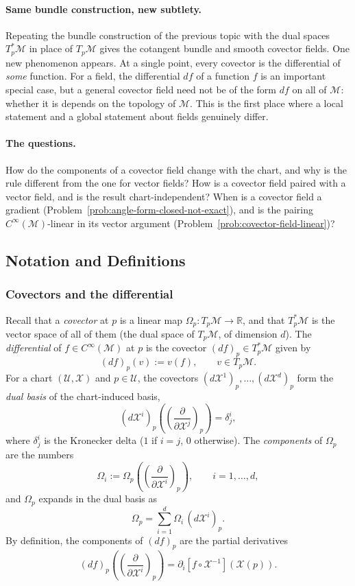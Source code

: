 \documentclass[11pt]{article}
\newcommand{\TpM}{T_p\mathcal M}
\newcommand{\TpsM}{T_p^*\mathcal M}
\newcommand{\Cinf}{C^\infty(\mathcal M)}
\begin{document}
\paragraph{Same bundle construction, new subtlety.}
Repeating the bundle construction of the previous topic with the dual spaces $T_p^*\mathcal M$ in place of $\TpM$ gives the cotangent bundle and smooth covector fields. One new phenomenon appears. At a single point, every covector is the differential of \emph{some} function. For a field, the differential $df$ of a function $f$ is an important special case, but a general covector field need not be of the form $df$ on all of $\mathcal M$: whether it is depends on the topology of $\mathcal M$. This is the first place where a local statement and a global statement about fields genuinely differ.

\paragraph{The questions.}
How do the components of a covector field change with the chart, and why is the rule different from the one for vector fields? How is a covector field paired with a vector field, and is the result chart-independent? When is a covector field a gradient (Problem~\ref{prob:angle-form-closed-not-exact}), and is the pairing $\Cinf$-linear in its vector argument (Problem~\ref{prob:covector-field-linear})?

\subsection*{Notation and Definitions}

\subsubsection*{Covectors and the differential}
Recall that a \emph{covector} at $p$ is a linear map $\Omega_p:\TpM\to\mathbb R$, and that $\TpsM$ is the vector space of all of them (the dual space of $\TpM$, of dimension $d$). The \emph{differential} of $f\in\Cinf$ at $p$ is the covector $(df)_p\in\TpsM$ given by
\[
(df)_p(v):=v(f),\qquad v\in\TpM.
\]
For a chart $(\mathcal U,\mathcal X)$ and $p\in\mathcal U$, the covectors $(d\mathcal X^1)_p,\dots,(d\mathcal X^d)_p$ form the \emph{dual basis} of the chart-induced basis,
\[
(d\mathcal X^i)_p\!\left(\left(\frac{\partial}{\partial\mathcal X^j}\right)_p\right)=\delta^i_j,
\]
where $\delta^i_j$ is the Kronecker delta ($1$ if $i=j$, $0$ otherwise). The \emph{components} of $\Omega_p$ are the numbers
\[
\Omega_i:=\Omega_p\!\left(\left(\frac{\partial}{\partial\mathcal X^i}\right)_p\right),\qquad i=1,\dots,d,
\]
and $\Omega_p$ expands in the dual basis as
\[
\Omega_p=\sum_{i=1}^d\Omega_i\,(d\mathcal X^i)_p.
\]
By definition, the components of $(df)_p$ are the partial derivatives
\[
(df)_p\!\left(\left(\frac{\partial}{\partial\mathcal X^i}\right)_p\right)=\partial_i[f\circ\mathcal X^{-1}](\mathcal X(p)).
\]
\end{document}
